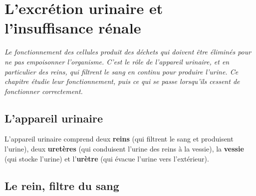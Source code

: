 \chapter{L'excrétion urinaire et l'insuffisance rénale}

\noindent\textit{Le fonctionnement des cellules produit des déchets qui doivent être
éliminés pour ne pas empoisonner l'organisme. C'est le rôle de l'appareil urinaire, et en
particulier des reins, qui filtrent le sang en continu pour produire l'urine. Ce chapitre
étudie leur fonctionnement, puis ce qui se passe lorsqu'ils cessent de fonctionner
correctement.}
\vspace{8pt}

\connecteBanner

\section{L'appareil urinaire}

\begin{definition}
L'appareil urinaire comprend deux \textbf{reins} (qui filtrent le sang et produisent
l'urine), deux \textbf{uretères} (qui conduisent l'urine des reins à la vessie), la
\textbf{vessie} (qui stocke l'urine) et l'\textbf{urètre} (qui évacue l'urine vers
l'extérieur).
\end{definition}

\begin{illus}
\end{illus}

\section{Le rein, filtre du sang}

